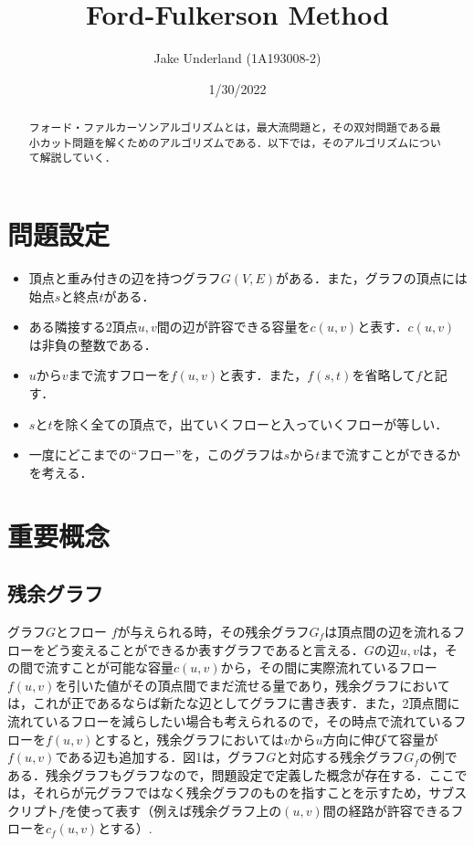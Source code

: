 \documentclass[
]{ltjarticle}
\title{Ford-Fulkerson Method}
\author{Jake Underland (1A193008-2)}
\date{1/30/2022}
\providecommand{\tightlist}{%
  \setlength{\itemsep}{0pt}\setlength{\parskip}{0pt}}
\begin{document}
\maketitle

{
\setcounter{tocdepth}{3}
\tableofcontents
}
\begin{abstract} 
フォード・ファルカーソンアルゴリズムとは，最大流問題と，その双対問題である最小カット問題を解くためのアルゴリズムである．以下では，そのアルゴリズムについて解説していく． 
\end{abstract}

\hypertarget{ux554fux984cux8a2dux5b9a}{%
\section{問題設定}\label{ux554fux984cux8a2dux5b9a}}

\begin{itemize}
\tightlist
\item
  頂点と重み付きの辺を持つグラフ\(G(V,E)\)がある．また，グラフの頂点には始点\(s\)と終点\(t\)がある．
\item
  ある隣接する2頂点\(u,v\)間の辺が許容できる容量を\(c(u,v)\)と表す．\(c(u,v)\)は非負の整数である．
\item
  \(u\)から\(v\)まで流すフローを\(f(u, v)\)と表す．また，\(f(s,t)\)を省略して\(f\)と記す．
\item
  \(s\)と\(t\)を除く全ての頂点で，出ていくフローと入っていくフローが等しい．
\item
  一度にどこまでの``フロー''を，このグラフは\(s\)から\(t\)まで流すことができるかを考える．
\end{itemize}

\hypertarget{ux91cdux8981ux6982ux5ff5}{%
\section{重要概念}\label{ux91cdux8981ux6982ux5ff5}}

\hypertarget{ux6b8bux4f59ux30b0ux30e9ux30d5}{%
\subsection{残余グラフ}\label{ux6b8bux4f59ux30b0ux30e9ux30d5}}

グラフ\(G\)とフロー
\(f\)が与えられる時，その残余グラフ\(G_f\)は頂点間の辺を流れるフローをどう変えることができるか表すグラフであると言える．\(G\)の辺\(u,v\)は，その間で流すことが可能な容量\(c(u,v)\)から，その間に実際流れているフロー\(f(u,v)\)を引いた値がその頂点間でまだ流せる量であり，残余グラフにおいては，これが正であるならば新たな辺としてグラフに書き表す．また，2頂点間に流れているフローを減らしたい場合も考えられるので，その時点で流れているフローを\(f(u,v)\)とすると，残余グラフにおいては\(v\)から\(u\)方向に伸びて容量が\(f(u,v)\)である辺も追加する．図1は，グラフ\(G\)と対応する残余グラフ\(G_f\)の例である．残余グラフもグラフなので，問題設定で定義した概念が存在する．ここでは，それらが元グラフではなく残余グラフのものを指すことを示すため，サブスクリプト\(f\)を使って表す（例えば残余グラフ上の\((u, v)\)間の経路が許容できるフローを\(c_f(u, v)\)とする）.
\end{document}
